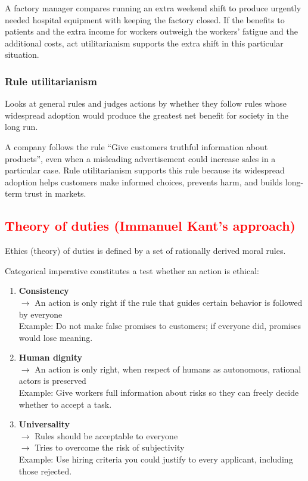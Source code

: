 \documentclass{article}
\DeclareRobustCommand{\k}[1]{\textcolor{red}{#1}}
\begin{document}
A factory manager compares running an extra weekend shift to produce urgently
needed hospital equipment with keeping the factory closed. If the benefits to
patients and the extra income for workers outweigh the workers' fatigue and the
additional costs, act utilitarianism supports the extra shift in this particular
situation.

\subsubsection{Rule utilitarianism}
Looks at general rules and judges actions by whether they follow rules whose
widespread adoption would produce the greatest net benefit for society in the long run.

A company follows the rule ``Give customers truthful information about products'',
even when a misleading advertisement could increase sales in a particular case.
Rule utilitarianism supports this rule because its widespread adoption helps
customers make informed choices, prevents harm, and builds long-term trust in markets.

\subsection{\k{Theory of duties (Immanuel Kant's approach)}}
Ethics (theory) of duties is defined by a set of rationally derived moral rules.

Categorical imperative constitutes a test whether an action is ethical:
\begin{enumerate}[label=\textbf{Maxim \arabic*.}, leftmargin=*, labelindent=0pt, align=left]
    \item \textbf{Consistency}\\
    $\to$ An action is only right if the rule that guides certain behavior is followed by everyone\\
    Example: Do not make false promises to customers; if everyone did, promises would lose meaning.
    \item \textbf{Human dignity}\\
    $\to$ An action is only right, when respect of humans as autonomous, rational actors is preserved\\
    Example: Give workers full information about risks so they can freely decide whether to accept a task.
    \item \textbf{Universality}\\
    $\to$ Rules should be acceptable to everyone\\
    $\to$ Tries to overcome the risk of subjectivity\\
    Example: Use hiring criteria you could justify to every applicant, including those rejected.
\end{enumerate}
\end{document}
